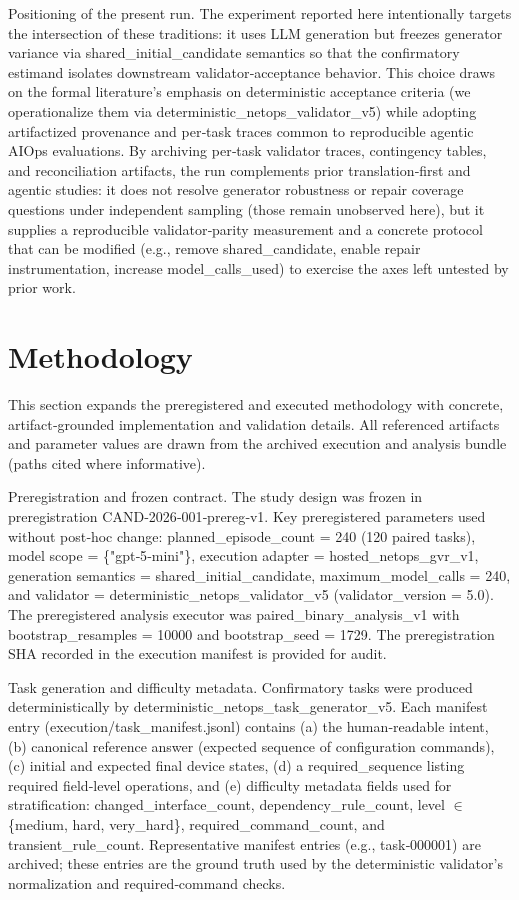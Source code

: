 \documentclass[conference]{IEEEtran}
\begin{document}
Positioning of the present run. The experiment reported here intentionally targets the intersection of these traditions: it uses LLM generation but freezes generator variance via shared\_initial\_candidate semantics so that the confirmatory estimand isolates downstream validator‑acceptance behavior. This choice draws on the formal literature's emphasis on deterministic acceptance criteria (we operationalize them via deterministic\_netops\_validator\_v5) while adopting artifactized provenance and per‑task traces common to reproducible agentic AIOps evaluations. By archiving per‑task validator traces, contingency tables, and reconciliation artifacts, the run complements prior translation‑first and agentic studies: it does not resolve generator robustness or repair coverage questions under independent sampling (those remain unobserved here), but it supplies a reproducible validator‑parity measurement and a concrete protocol that can be modified (e.g., remove shared\_candidate, enable repair instrumentation, increase model\_calls\_used) to exercise the axes left untested by prior work.

\section{Methodology}
This section expands the preregistered and executed methodology with concrete, artifact‑grounded implementation and validation details. All referenced artifacts and parameter values are drawn from the archived execution and analysis bundle (paths cited where informative).

Preregistration and frozen contract. The study design was frozen in preregistration CAND‑2026‑001‑prereg‑v1. Key preregistered parameters used without post‑hoc change: planned\_episode\_count = 240 (120 paired tasks), model scope = \{"gpt‑5‑mini"\}, execution adapter = hosted\_netops\_gvr\_v1, generation semantics = shared\_initial\_candidate, maximum\_model\_calls = 240, and validator = deterministic\_netops\_validator\_v5 (validator\_version = 5.0). The preregistered analysis executor was paired\_binary\_analysis\_v1 with bootstrap\_resamples = 10000 and bootstrap\_seed = 1729. The preregistration SHA recorded in the execution manifest is provided for audit.

Task generation and difficulty metadata. Confirmatory tasks were produced deterministically by deterministic\_netops\_task\_generator\_v5. Each manifest entry (execution/task\_manifest.jsonl) contains (a) the human‑readable intent, (b) canonical reference answer (expected sequence of configuration commands), (c) initial and expected final device states, (d) a required\_sequence listing required field‑level operations, and (e) difficulty metadata fields used for stratification: changed\_interface\_count, dependency\_rule\_count, level \ensuremath{\in} \{medium, hard, very\_hard\}, required\_command\_count, and transient\_rule\_count. Representative manifest entries (e.g., task‑000001) are archived; these entries are the ground truth used by the deterministic validator's normalization and required‑command checks.
\end{document}
